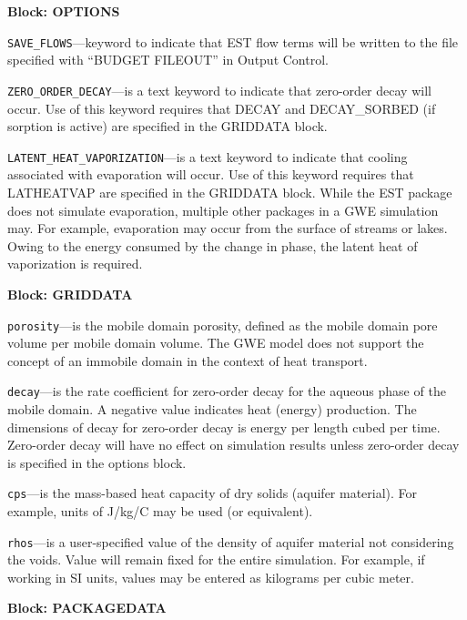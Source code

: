 
\item \textbf{Block: OPTIONS}

\begin{description}
\item \texttt{SAVE\_FLOWS}---keyword to indicate that EST flow terms will be written to the file specified with ``BUDGET FILEOUT'' in Output Control.

\item \texttt{ZERO\_ORDER\_DECAY}---is a text keyword to indicate that zero-order decay will occur.  Use of this keyword requires that DECAY and DECAY\_SORBED (if sorption is active) are specified in the GRIDDATA block.

\item \texttt{LATENT\_HEAT\_VAPORIZATION}---is a text keyword to indicate that cooling associated with evaporation will occur.  Use of this keyword requires that LATHEATVAP are specified in the GRIDDATA block.  While the EST package does not simulate evaporation, multiple other packages in a GWE simulation may.  For example, evaporation may occur from the surface of streams or lakes.  Owing to the energy consumed by the change in phase, the latent heat of vaporization is required.

\end{description}
\item \textbf{Block: GRIDDATA}

\begin{description}
\item \texttt{porosity}---is the mobile domain porosity, defined as the mobile domain pore volume per mobile domain volume.  The GWE model does not support the concept of an immobile domain in the context of heat transport.

\item \texttt{decay}---is the rate coefficient for zero-order decay for the aqueous phase of the mobile domain.  A negative value indicates heat (energy) production.  The dimensions of decay for zero-order decay is energy per length cubed per time.  Zero-order decay will have no effect on simulation results unless zero-order decay is specified in the options block.

\item \texttt{cps}---is the mass-based heat capacity of dry solids (aquifer material). For example, units of J/kg/C may be used (or equivalent).

\item \texttt{rhos}---is a user-specified value of the density of aquifer material not considering the voids. Value will remain fixed for the entire simulation.  For example, if working in SI units, values may be entered as kilograms per cubic meter.

\end{description}
\item \textbf{Block: PACKAGEDATA}

